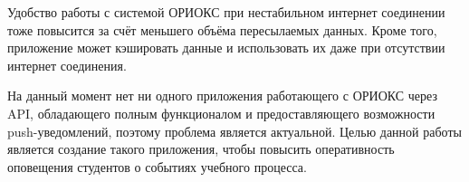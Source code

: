 Удобство работы с системой ОРИОКС при нестабильном интернет соединении тоже повысится за счёт меньшего объёма пересылаемых данных.
Кроме того, приложение может кэшировать данные и использовать их даже при отсутствии интернет соединения.

На данный момент нет ни одного приложения работающего с ОРИОКС через API, обладающего полным функционалом и предоставляющего возможности push-уведомлений, поэтому проблема является актуальной.
Целью данной работы является создание такого приложения, чтобы повысить оперативность оповещения студентов о событиях учебного процесса.



